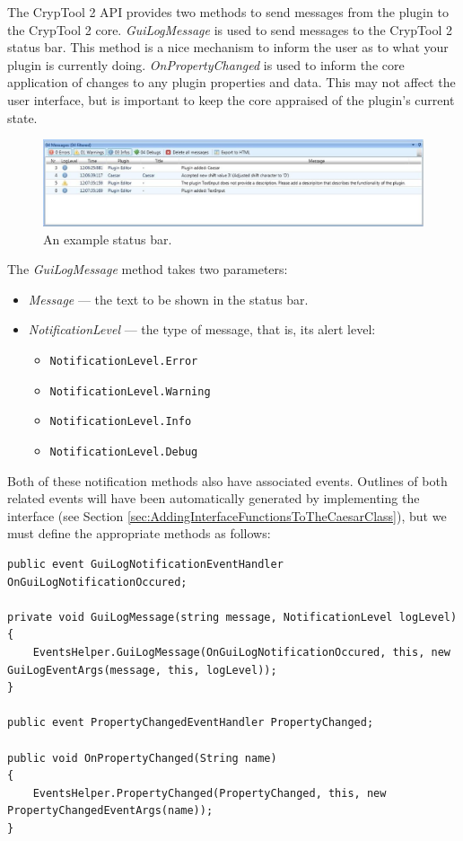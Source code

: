 The CrypTool 2 API provides two methods to send messages from the plugin to the CrypTool 2 core. \textit{GuiLogMessage} is used to send messages to the CrypTool 2 status bar. This method is a nice mechanism to inform the user as to what your plugin is currently doing. \textit{OnPropertyChanged} is used to inform the core application of changes to any plugin properties and data. This may not affect the user interface, but is important to keep the core appraised of the plugin's current state.

\begin{figure}[h]
	\centering
		\includegraphics[width=1.00\textwidth]{figures/status_bar.jpg}
	\caption{An example status bar.}
	\label{fig:status_bar}
\end{figure}
\clearpage

The \textit{GuiLogMessage} method takes two parameters:

\begin{itemize}
	\item \textit{Message} --- the text to be shown in the status bar.
	\item \textit{NotificationLevel} --- the type of message, that is, its alert level:
	\begin{itemize}
		\item \texttt{NotificationLevel.Error}
		\item \texttt{NotificationLevel.Warning}
		\item \texttt{NotificationLevel.Info}
		\item \texttt{NotificationLevel.Debug}
	\end{itemize}
\end{itemize}

Both of these notification methods also have associated events. Outlines of both related events will have been automatically generated by implementing the interface (see Section \ref{sec:AddingInterfaceFunctionsToTheCaesarClass}), but we must define the appropriate methods as follows:

\begin{lstlisting}
public event GuiLogNotificationEventHandler OnGuiLogNotificationOccured;

private void GuiLogMessage(string message, NotificationLevel logLevel)
{
	EventsHelper.GuiLogMessage(OnGuiLogNotificationOccured, this, new GuiLogEventArgs(message, this, logLevel));
}

public event PropertyChangedEventHandler PropertyChanged;

public void OnPropertyChanged(String name)
{
	EventsHelper.PropertyChanged(PropertyChanged, this, new PropertyChangedEventArgs(name));
}
\end{lstlisting}

